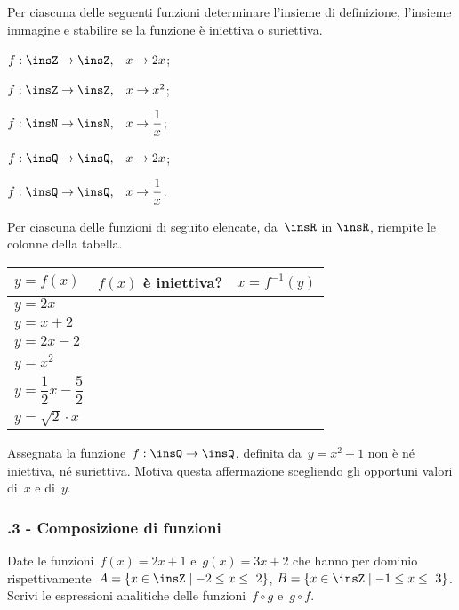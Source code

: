 \begin{esercizio}
 \label{ese:\thechapter.10}
Per ciascuna delle seguenti funzioni determinare l'insieme di definizione, l'insieme
immagine e stabilire se la funzione è iniettiva o suriettiva.

\begin{enumeratea}
\item $f:\insZ\rightarrow\insZ\text{,}\quad x\rightarrow 2x$;
\item $f:\insZ\rightarrow\insZ\text{,}\quad x\rightarrow x^{2}$;
\item $f:\insN\rightarrow\insN\text{,}\quad x\rightarrow \dfrac{1}{x}$;
\item $f:\insQ\rightarrow\insQ\text{,}\quad x\rightarrow 2x$;
\item $f:\insQ\rightarrow\insQ\text{,}\quad x\rightarrow \dfrac{1}{x}$.
\end{enumeratea}
\end{esercizio}

\begin{esercizio}
 \label{ese:\thechapter.11}
Per ciascuna delle funzioni di seguito elencate, da~$\insR$ in $\insR$, riempite le colonne della tabella.
\begin{center}
\begin{tabular}{l*2{c}}
\toprule
$y=f(x)$ & $f(x)$ è iniettiva? & $x=f^{-1}(y)$\\
\midrule
$y=2x$ & & \\
$y=x+2$ & & \\
$y=2x-2$ & & \\
$y=x^{2}$ & & \\
$y=\dfrac{1}{2}x-\dfrac{5}{2}$ & & \\
$y=\sqrt{2}\cdot x$ & & \\
\bottomrule
\end{tabular}
\end{center}
\end{esercizio}

\begin{esercizio}
 \label{ese:\thechapter.12}
Assegnata la funzione~$f:\insQ \rightarrow \insQ$, definita da~$y=x^2+1$ non è né iniettiva, né suriettiva. Motiva questa affermazione scegliendo gli opportuni valori di~$x$ e di~$y$.
\end{esercizio}

\subsubsection*{\thechapter.3 - Composizione di funzioni}
\begin{esercizio}
 \label{ese:\thechapter.13}
Date le funzioni~$f(x)=2x+1$ e~$g(x)=3x+2$ che hanno per dominio
rispettivamente~$A=\left\{x\in \insZ\mid -2\le x\le~2\right\}$,
$B=\left\{x\in \insZ\mid -1\le x\le~3\right\}$.
Scrivi le espressioni analitiche delle funzioni~$f\circ g$ e~$g\circ f$.
\end{esercizio}


